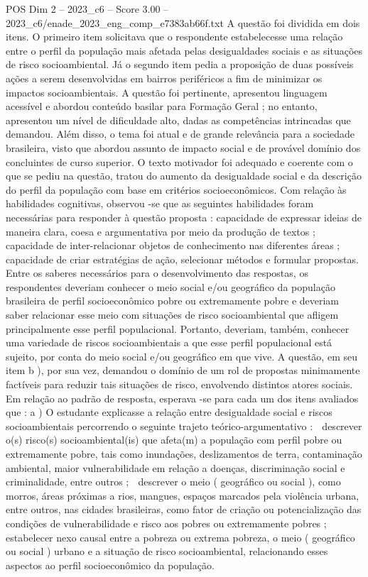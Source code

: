 \begin{textsample}{POS Dim 2 – 2023\_c6 – Score 3.00 – 2023\_c6/enade\_2023\_eng\_comp\_e7383ab66f.txt}
A questão foi dividida em dois itens.
O primeiro item solicitava que o respondente estabelecesse uma relação entre o perfil da população mais afetada pelas desigualdades sociais e as situações de risco socioambiental.
Já o segundo item pedia a proposição de duas possíveis ações a serem desenvolvidas em bairros periféricos a fim de minimizar os impactos socioambientais.
A questão foi pertinente, apresentou linguagem acessível e abordou conteúdo basilar para Formação Geral ; no entanto, apresentou um nível de dificuldade alto, dadas as competências intrincadas que demandou.
Além disso, o tema foi atual e de grande relevância para a sociedade brasileira, visto que abordou assunto de impacto social e de provável domínio dos concluintes de curso superior.
O texto motivador foi adequado e coerente com o que se pediu na questão, tratou do aumento da desigualdade social e da descrição do perfil da população com base em critérios socioeconômicos.
Com relação às habilidades cognitivas, observou -se que as seguintes habilidades foram necessárias para responder à questão proposta : capacidade de expressar ideias de maneira clara, coesa e argumentativa por meio da produção de textos ; capacidade de inter-relacionar objetos de conhecimento nas diferentes áreas ; capacidade de criar estratégias de ação, selecionar métodos e formular propostas.
Entre os saberes necessários para o desenvolvimento das respostas, os respondentes deveriam conhecer o meio social e/ou geográfico da população brasileira de perfil socioeconômico pobre ou extremamente pobre e deveriam saber relacionar esse meio com situações de risco socioambiental que afligem principalmente esse perfil populacional.
Portanto, deveriam, também, conhecer uma variedade de riscos socioambientais a que esse perfil populacional está sujeito, por conta do meio social e/ou geográfico em que vive.
A questão, em seu item b ), por sua vez, demandou o domínio de um rol de propostas minimamente factíveis para reduzir tais situações de risco, envolvendo distintos atores sociais.
Em relação ao padrão de resposta, esperava -se para cada um dos itens avaliados que : a ) O estudante explicasse a relação entre desigualdade social e riscos socioambientais percorrendo o seguinte trajeto teórico-argumentativo :  descrever o(s) risco(s) socioambiental(is) que afeta(m) a população com perfil pobre ou extremamente pobre, tais como inundações, deslizamentos de terra, contaminação ambiental, maior vulnerabilidade em relação a doenças, discriminação social e criminalidade, entre outros ;  descrever o meio ( geográfico ou social ), como morros, áreas próximas a rios, mangues, espaços marcados pela violência urbana, entre outros, nas cidades brasileiras, como fator de criação ou potencialização das condições de vulnerabilidade e risco aos pobres ou extremamente pobres ;  estabelecer nexo causal entre a pobreza ou extrema pobreza, o meio ( geográfico ou social ) urbano e a situação de risco socioambiental, relacionando esses aspectos ao perfil socioeconômico da população.

\end{textsample}
